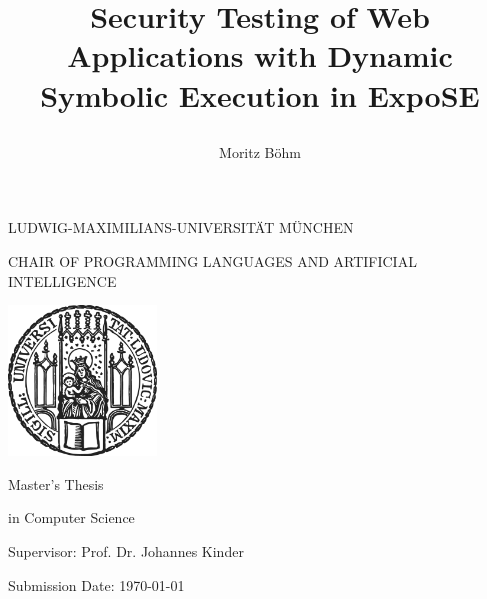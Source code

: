 \documentclass[thesis]{plai}
\title{
    \begin{center}
        \bfseries\LARGE
        Security Testing of Web Applications with Dynamic Symbolic Execution in ExpoSE
    \end{center}
}
\author{
    \begin{center}
        \large
        Moritz Böhm
    \end{center}
}
\date{\relax}
\begin{document}
\begin{center}
    \uppercase{Ludwig-Maximilians-Universität München}
\end{center}

\begin{center}
    \uppercase{Chair of Programming Languages and Artificial Intelligence}
\end{center}

\vspace*{10mm}

\begin{center}
    \includegraphics[height=40mm]{sigillum.png}
\end{center}

\vspace*{10mm}

{\let\newpage\relax\maketitle}

\thispagestyle{empty}

\begin{center}
    \begin{large}
        \begin{Large}
            Master's Thesis \\
        \end{Large}
         in Computer Science\\
    \end{large}
\end{center}

\vspace{1cm}

\begin{center}
    \begin{large}
        Supervisor: Prof. Dr. Johannes Kinder\\
    \end{large}
\end{center}



\begin{center}
    \begin{large}
        Submission Date: \today{}\\
    \end{large}
\end{center}
\end{document}
